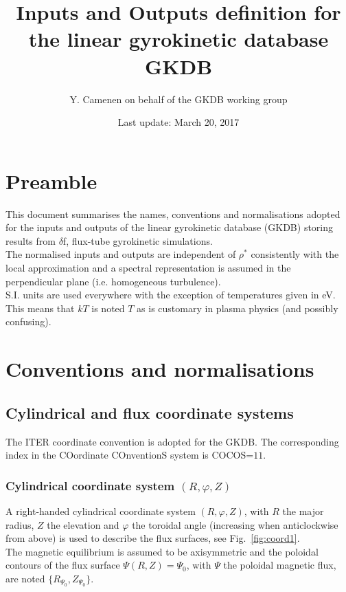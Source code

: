 \documentclass[fleqn]{report}
\begin{document}
\title{Inputs and Outputs definition for the linear gyrokinetic database GKDB}

\author{Y. Camenen on behalf of the GKDB working group}

\date{Last update: March 20, 2017}

\maketitle


\chapter{Preamble}

This document summarises the names, conventions and normalisations adopted for the inputs and outputs of the linear gyrokinetic database (GKDB) storing results from $\delta$f, flux-tube gyrokinetic simulations.\\ 

The normalised inputs and outputs are independent of $\rho^*$ consistently with the local approximation and a spectral representation is assumed in the perpendicular plane (i.e. homogeneous turbulence).\\

S.I. units are used everywhere with the exception of temperatures given in eV. This means that $kT$ is noted $T$ as is customary in plasma physics (and possibly confusing).



\chapter{Conventions and normalisations}
\label{chap:normdef}
\section{Cylindrical and flux coordinate systems}
The ITER coordinate convention is adopted for the GKDB. The corresponding index in the COordinate COnventionS system  \cite{Sauter:CPC2013} is COCOS=$11$.
\subsection{Cylindrical coordinate system $(R,\varphi,Z)$}
A right-handed cylindrical coordinate system $(R,\varphi,Z)$, with $R$ the major radius, $Z$ the elevation and $\varphi$ the toroidal angle (increasing when anticlockwise from above) is used to describe the flux surfaces, see Fig.~\ref{fig:coord1}. \\
The magnetic equilibrium is assumed to be axisymmetric and the poloidal contours of the flux surface $\Psi(R,Z)=\Psi_0$, with $\Psi$ the poloidal magnetic flux, are noted $\{R_{\Psi_0},Z_{\Psi_0}\}$.
\end{document}
